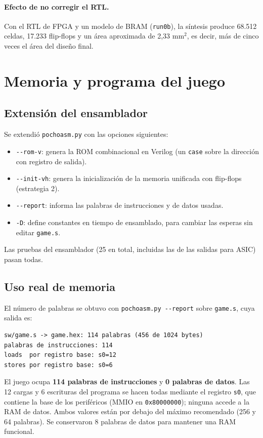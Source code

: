 \documentclass[11pt,letterpaper]{article}
\newcommand{\code}[1]{\texttt{#1}}
\begin{document}
\paragraph{Efecto de no corregir el RTL.} Con el RTL de FPGA y un modelo de BRAM (\code{run0b}), la síntesis produce 68.512 celdas, 17.233 flip-flops y un área aproximada de 2,33 mm$^2$, es decir, más de cinco veces el área del diseño final.

\section{Memoria y programa del juego}
\label{sec:mem}

\subsection{Extensión del ensamblador}

Se extendió \code{pochoasm.py} con las opciones siguientes:
\begin{itemize}
  \item \code{-{}-rom-v}: genera la ROM combinacional en Verilog (un \code{case} sobre la dirección con registro de salida).
  \item \code{-{}-init-vh}: genera la inicialización de la memoria unificada con flip-flops (estrategia 2).
  \item \code{-{}-report}: informa las palabras de instrucciones y de datos usadas.
  \item \code{-D}: define constantes en tiempo de ensamblado, para cambiar las esperas sin editar \code{game.s}.
\end{itemize}
Las pruebas del ensamblador (25 en total, incluidas las de las salidas para ASIC) pasan todas.

\subsection{Uso real de memoria}

El número de palabras se obtuvo con \code{pochoasm.py -{}-report} sobre \code{game.s}, cuya salida es:
\begin{lstlisting}
sw/game.s -> game.hex: 114 palabras (456 de 1024 bytes)
palabras de instrucciones: 114
loads  por registro base: s0=12
stores por registro base: s0=6
\end{lstlisting}
El juego ocupa \textbf{114 palabras de instrucciones} y \textbf{0 palabras de datos}. Las 12 cargas y 6 escrituras del programa se hacen todas mediante el registro \code{s0}, que contiene la base de los periféricos (MMIO en \code{0x80000000}); ninguna accede a la RAM de datos. Ambos valores están por debajo del máximo recomendado (256 y 64 palabras). Se conservaron 8 palabras de datos para mantener una RAM funcional.
\end{document}
